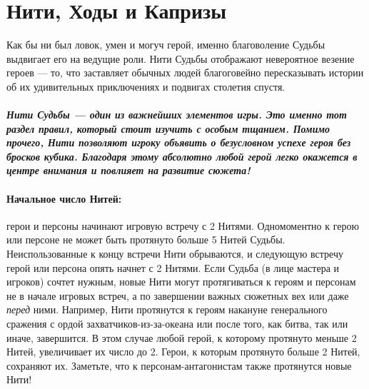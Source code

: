 \section{Нити, Ходы и Капризы}
Как бы ни был ловок, умен и могуч герой, именно благоволение Судьбы выдвигает его на ведущие роли. Нити Судьбы отображают невероятное везение героев — то, что заставляет обычных людей благоговейно пересказывать истории об их удивительных приключениях и подвигах столетия спустя.
\paragraph{\textit{Нити Судьбы — один из важнейших элементов игры. Это именно тот раздел правил, который стоит изучить с особым тщанием. Помимо прочего, Нити позволяют игроку объявить о безусловном успехе героя без бросков кубика. Благодаря этому абсолютно любой герой легко окажется в центре внимания и повлияет на развитие сюжета!}}
\paragraph{Начальное число Нитей:} герои и персоны начинают игровую встречу с 2 Нитями. Одномоментно к герою или персоне не может быть протянуто больше 5 Нитей Судьбы. Неиспользованные к концу встречи Нити обрываются, и следующую встречу герой или персона опять начнет с 2 Нитями.
\newline
Если Судьба (в лице мастера и игроков) сочтет нужным, новые Нити могут протягиваться к героям и персонам не в начале игровых встреч, а по завершении важных сюжетных вех или даже \textit{перед} ними. Например, Нити протянутся к героям накануне генерального сражения с ордой захватчиков-из-за-океана или после того, как битва, так или иначе, завершится. В этом случае любой герой, к которому протянуто меньше 2 Нитей, увеличивает их число до 2. Герои, к которым протянуто больше 2 Нитей, сохраняют их. Заметьте, что к персонам-антагонистам также протянутся новые Нити!
